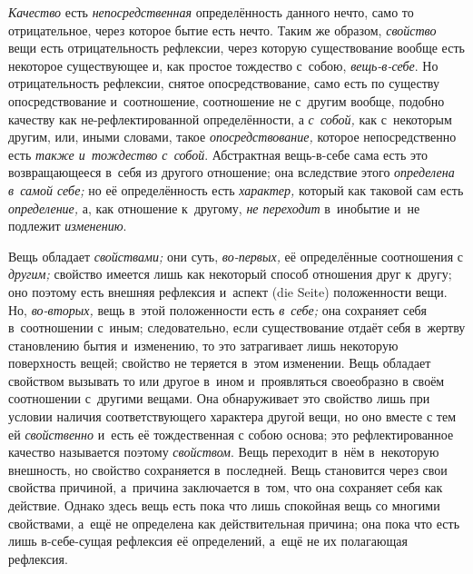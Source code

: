 {\em Качество} есть {\em непосредственная} определённость данного нечто,
само то отрицательное, через которое бытие есть нечто. Таким же образом,
{\em свойство} вещи есть отрицательность рефлексии,
через которую существование вообще есть некоторое существующее и, как
простое тождество с~собою, {\em вещь-в-себе}. Но
отрицательность рефлексии, снятое опосредствование, само есть по существу
опосредствование и~соотношение, соотношение не с~другим вообще, подобно
качеству как не-рефлектированной определённости, а
{\em с~собой,} как с~некоторым другим, или, иными
словами, такое {\em опосредствование,} которое
непосредственно есть {\em также и~тождество с~собой}.
Абстрактная вещь-в-себе сама есть это возвращающееся в~себя из другого
отношение; она вследствие этого {\em определена в~самой
себе;} но её определённость есть {\em характер,}
который как таковой сам есть {\em определение,} а, как
отношение к~другому, {\em не переходит} в~инобытие и~не
подлежит {\em изменению}.

Вещь обладает {\em свойствами;} они суть,
{\em во-первых,} её определённые соотношения с
{\em другим;} свойство имеется лишь как некоторый
способ отношения друг к~другу; оно поэтому есть внешняя рефлексия и~аспект
(die Seite) положенности вещи. Но, {\em во-вторых,}
вещь в~этой положенности есть {\em в~себе;} она
сохраняет себя в~соотношении с~иным; следовательно, если существование
отдаёт себя в~жертву становлению бытия и~изменению, то это затрагивает лишь
некоторую поверхность вещей; свойство не теряется в~этом изменении. Вещь
обладает свойством вызывать то или другое в~ином и~проявляться своеобразно
в своём соотношении с~другими вещами. Она обнаруживает это свойство лишь
при условии наличия соответствующего характера другой вещи, но оно вместе с
тем ей {\em свойственно} и~есть её тождественная с
собою основа; это рефлектированное качество называется поэтому
{\em свойством}. Вещь переходит в~нём в~некоторую
внешность, но свойство сохраняется в~последней. Вещь становится через свои
свойства причиной, а~причина заключается в~том, что она сохраняет себя как
действие. Однако здесь вещь есть пока что лишь спокойная вещь со многими
свойствами, а~ещё не определена как действительная причина; она пока что
есть лишь в-себе-сущая рефлексия её определений, а~ещё не их полагающая
рефлексия.

